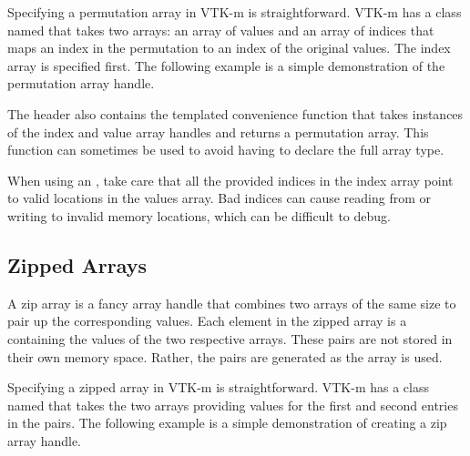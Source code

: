 Specifying a permutation array in VTK-m is straightforward. VTK-m has a
class named  that takes two arrays: an
array of values and an array of indices that maps an index in the
permutation to an index of the original values. The index array is
specified first. The following example is a simple demonstration of the
permutation array handle.


The  header also contains the
templated convenience function  that
takes instances of the index and value array handles and returns a
permutation array. This function can sometimes be used to avoid having to
declare the full array type.


When using an , take care that all
the provided indices in the index array point to valid locations in the
values array. Bad indices can cause reading from or writing to invalid
memory locations, which can be difficult to debug.


\subsection{Zipped Arrays}
\label{sec:ZippedArrays}


A zip array is a fancy array handle that combines two arrays of the same
size to pair up the corresponding values. Each element in the zipped array
is a  containing the values of the two respective arrays. These
pairs are not stored in their own memory space. Rather, the pairs are
generated as the array is used.

Specifying a zipped array in VTK-m is straightforward. VTK-m has a class
named  that takes the two arrays providing values
for the first and second entries in the pairs. The following example is a
simple demonstration of creating a zip array handle.


